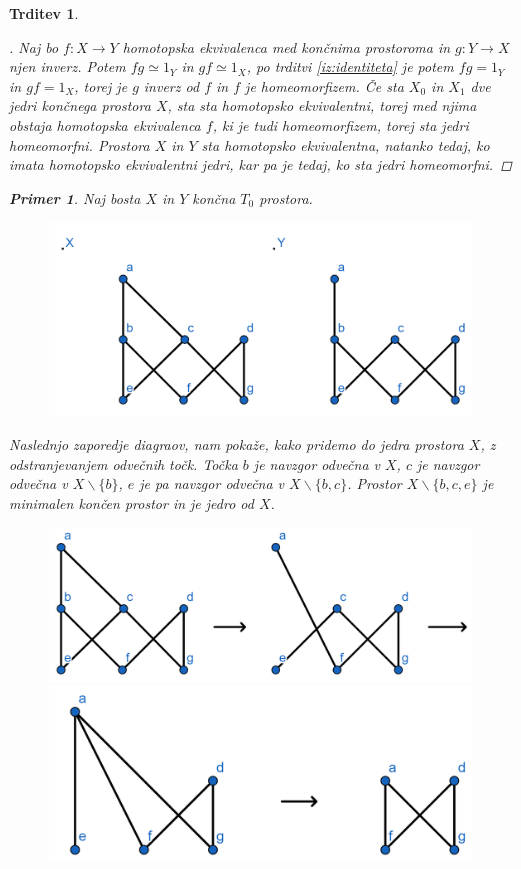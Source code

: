 \documentclass[a4paper,12pt]{article}
\theoremstyle{definition}
\theoremstyle{plain}
\theoremstyle{definition}
\newtheorem{primer}{Primer}
\theoremstyle{plain}
\newtheorem{trditev}{Trditev}
\theoremstyle{plain}
\theoremstyle{plain}
\theoremstyle{plain}
\newenvironment{dokaz}{\begin{proof}[\bfseries\upshape\proofname]}{\end{proof}}
\begin{document}
\begin{trditev}
\begin{dokaz}
    Naj bo $f:X\rightarrow Y$ homotopska ekvivalenca med 
    končnima prostoroma in $g:Y\rightarrow X$ njen inverz. 
    Potem $fg\simeq 1_Y$ in $gf \simeq 1_X$, po trditvi 
    \ref{iz:identiteta} je potem $fg = 1_Y$ in $gf = 1_X$,
    torej je $g$ inverz od $f$ in $f$ je homeomorfizem. Če 
    sta $X_0$ in $X_1$ dve jedri končnega prostora $X$, sta 
    sta homotopsko ekvivalentni, torej med njima obstaja homotopska ekvivalenca $f$, 
    ki je tudi homeomorfizem, torej sta jedri homeomorfni. 
    Prostora $X$ in $Y$ sta homotopsko ekvivalentna, 
    natanko tedaj, ko imata homotopsko ekvivalentni jedri, 
    kar pa je tedaj, ko sta jedri homeomorfni.
\end{dokaz}
\begin{primer}
    Naj bosta $X$ in $Y$ končna $T_0$ prostora.
    \begin{figure}[h]
        \centering
        \includegraphics[width=0.6\linewidth]{xy.png}
    \end{figure}

Naslednjo zaporedje diagraov, nam pokaže, kako pridemo do jedra prostora $X$, z odstranjevanjem odvečnih točk. Točka $b$ je navzgor odvečna v $X$, $c$ je navzgor odvečna v $X\backslash\{b\}$, $e$ je pa navzgor odvečna v $X\backslash\{b,c\}$. Prostor $X\backslash \{b,c,e\}$ je minimalen končen prostor in je jedro od $X$.

\begin{figure}[h]
    \centering
    \includegraphics[width=0.6\linewidth]{prv.png}
    \includegraphics[width=0.6\linewidth]{drug.png}
\end{figure}


\end{primer}
\end{trditev}
\end{document}

